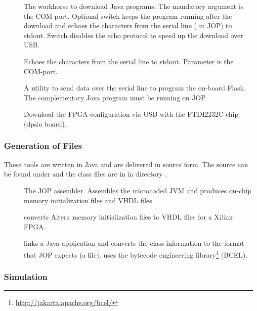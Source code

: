 \begin{description}
    \item[] The workhorse to download Java
        programs. The mandatory argument is the COM-port.
        Optional switch  keeps the program running after
        the download and echoes the characters from the serial
        line ( in JOP) to stdout. Switch
         disables the echo protocol to speed up the
        download over USB.
    \item[] Echoes the characters from the serial
        line to stdout. Parameter is the COM-port.
    \item[] A utility to send data over the serial
        line to program the on-board Flash. The complementary
        Java program  must be running on JOP.
    \item[] Download the FPGA configuration
        via USB with the FTDI2232C chip (dpsio board).
\end{description}

\subsubsection{Generation of Files}

These tools are written in Java and are delivered in source form.
The source can be found under  and the class
files are in  in directory
.

\begin{description}
    \item[] The JOP assembler. Assembles the
        microcoded JVM and produces on-chip memory initialization
        files and VHDL files.
    \item[] converts Altera memory initialization
        files to VHDL files for a Xilinx FPGA.
    \item[] links a Java application and converts
        the class information to the format that JOP expects (a
         file).  uses the bytecode
        engineering
        library\footnote{\url{http://jakarta.apache.org/bcel/}}
        (BCEL).

\end{description}

\subsubsection{Simulation}

